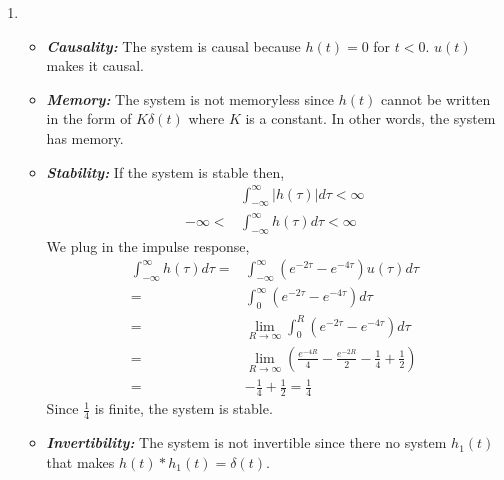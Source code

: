 \documentclass[10pt,a4paper, margin=1in]{article}
\begin{document}
\begin{enumerate}
\begin{enumerate}
    \item 
    \begin{itemize}
		\item \textbf{\textit{Causality:}} The system is causal because $h(t)=0$ for $t<0$. $u(t)$ makes it causal.\\
		\item \textbf{\textit{Memory:}} The system is not memoryless since $h(t)$ cannot be written in the form of $K\delta(t)$ where $K$ is a constant. In other words, the system has memory. \\ 
		\item \textbf{\textit{Stability:}} If the system is stable then,
		\begin{equation}
		\begin{split}
		&\int_{-\infty}^{\infty}|h(\tau)|d\tau < \infty \\
		-\infty < & \int_{-\infty}^{\infty}h(\tau)d\tau < \infty
		\end{split}
		\end{equation}
		We plug in the impulse response, 
		\begin{equation}
		\begin{split}
		\int_{-\infty}^{\infty}h(\tau)d\tau = &\int_{-\infty}^{\infty}(e^{-2\tau}-e^{-4\tau})u(\tau)d\tau \\
		= &\int_{0}^{\infty}(e^{-2\tau}-e^{-4\tau})d\tau \\
		= &\lim_{R\rightarrow \infty}\int_{0}^{R}(e^{-2\tau}-e^{-4\tau})d\tau \\
		= &\lim_{R\rightarrow \infty}(\frac{e^{-4R}}{4}-\frac{e^{-2R}}{2}-\frac{1}{4}+\frac{1}{2}) \\
		= & - \frac{1}{4} + \frac{1}{2} = \frac{1}{4}
		\end{split}
		\end{equation}	 
		Since $\frac{1}{4}$ is finite, the system is stable. \\
		\item \textbf{\textit{Invertibility:}} The system is not invertible since there no system $h_1(t)$ that makes $h(t)* h_1(t)=\delta(t)$.
	\end{itemize}
    \end{enumerate}

\end{enumerate}
\end{document}

